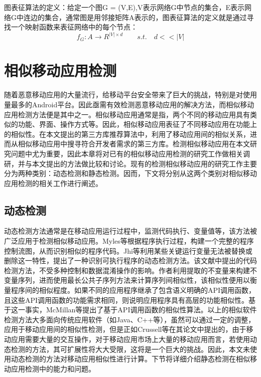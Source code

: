 图表征算法的定义：给定一个图G = (V,E),V表示网络G中节点的集合，E表示网络G中连边的集合，通常图是用邻接矩阵A表示的，图表征算法的定义就是通过寻找一个映射函数来表征网络中的每个节点：
\begin{equation}
f_G: A \rightarrow R^{|V| \times d} \qquad s.t.\quad d<<|V|
\end{equation}






\section{相似移动应用检测}
随着恶意移动应用的大量流行，给移动平台安全带来了巨大的挑战，特别是对使用量最多的Android平台\cite{huang2014asdroid}。因此亟需有效检测恶意移动应用的解决方法，而相似移动应用检测方法便是其中之一。相似移动应用通常是指，两个不同的移动应用具有类似的功能、界面、操作方式等。因此，相似移动应用表征了不同移动应用在功能上的相似性。在本文提出的第三方库推荐算法中，利用了移动应用间的相似关系，进而从相似移动应用中搜寻符合开发者需求的第三方库。检测相似移动应用在本文研究问题中尤为重要，因此本章将对已有的相似移动应用检测的研究工作做相关调研，并与本文提出的方法做比较和讨论。现有的检测相似移动应用的研究工作主要分为两种类别：动态检测和静态检测。因而，下文将分别从这两个类别对相似移动应用检测的相关工作进行阐述。

\subsection{动态检测}
动态检测方法通常是在移动应用运行过程中，监测代码执行、变量值等，该方法被广泛应用于检测相似移动应用。Myles等\cite{myles2004detecting}根据程序执行过程，构建一个完整的程序控制流图，从而识别相似的程序代码。Jhi等\cite{jhi2011value}利用某些关键运行变量无法被替换或删除这一特性，提出了一种识别可执行程序的动态检测方法。该文献中提出的代码检测方法，不受多种控制和数据混淆操作的影响。作者利用提取的不变量来构建不变量序列，进而使用最长公共子序列方法来计算序列间相似性，该相似性便用以衡量程序间的相似程度。如果不同的应用程序继承了包含语义明确的API调用函数，且这些API调用函数的功能需求相同，则说明应用程序具有高层的功能相似性。基于这一事实，McMillan等\cite{mcmillan2012detecting}提出了基于API调用函数的相似性算法。以上的相似软件检测方法大多面向传统应用软件（如Java、C++等），虽然可以通过一定的调整，应用于移动应用间的相似性检测，但是正如Crussell等\cite{crussell2012attack}在其论文中提出的，由于移动应用需要大量的交互操作，对于移动应用市场上大量的移动应用而言，若使用动态检测的方法，其可扩展性将大大受限，这将是一个巨大的挑战。因此，本文未使用动态检测的方法对移动应用相似性进行计算。下节将详细介绍静态检测在相似移动应用检测中的能力和问题。


